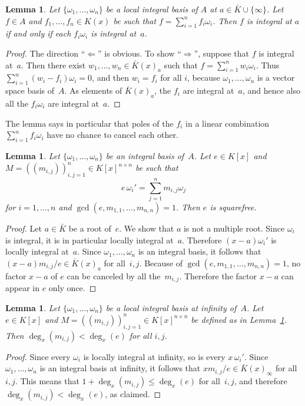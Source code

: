 \documentclass{sig-alternate}
\newtheorem{lemma}[theorem]{Lemma}
\begin{document}
\begin{lemma}\label{lemma:1}
  Let $\{\omega_1,\dots,\omega_n\}$ be a local integral basis of $A$ at $a\in\bar K\cup\{\infty\}$.
  Let $f\in A$ and $f_1,\dots,f_n\in K(x)$ be such that $f=\sum_{i=1}^nf_i\omega_i$.
  Then $f$ is integral at $a$ if and only if each $f_i\omega_i$ is integral at~$a$.
\end{lemma}
\begin{proof}
  The direction ``$\Leftarrow$'' is obvious. To show ``$\Rightarrow$'', suppose
  that $f$ is integral at~$a$. Then there exist $w_1,\dots,w_n\in\bar K(x)_a$ such that
  $f=\sum_{i=1}^nw_i\omega_i$. Thus $\sum_{i=1}^n(w_i-f_i)\omega_i=0$, and then
  $w_i=f_i$ for all $i$, because $\omega_1,\dots,\omega_n$ is a vector space basis of~$A$.
  As elements of $\bar K(x)_a$, the $f_i$ are integral at~$a$, and hence also all the $f_i\omega_i$
  are integral at~$a$.
\end{proof}

The lemma says in particular that poles of the $f_i$ in a linear combination
$\sum_{i=1}^n f_i\omega_i$ have no chance to cancel each other.

\begin{lemma}\label{lemma:e}
  Let $\{\omega_1,\dots,\omega_n\}$ be an integral basis of~$A$.
  Let $e\in K[x]$ and
  $M=((m_{i,j}))_{i,j=1}^n\in K[x]^{n\times n}$ be such that
  \[
    e\,\omega_i'=\sum_{j=1}^n m_{i,j}\omega_j
  \]
  for $i=1,\dots,n$ and $\gcd(e,m_{1,1},\dots,m_{n,n})=1$.
  Then $e$ is squarefree.
\end{lemma}
\begin{proof}
  Let $a\in\bar K$ be a root of~$e$. We show that $a$ is not a multiple root.
  Since $\omega_i$ is integral, it is in particular locally integral at~$a$.
  Therefore $(x-a)\omega_i'$ is locally integral at~$a$.
  Since $\omega_1,\dots,\omega_n$ is an integral basis, it follows that
  $(x-a)m_{i,j}/e\in\bar K(x)_a$ for all~$i,j$.
  Because of $\gcd(e,m_{1,1},\dots,m_{n,n})=1$, no factor $x-a$ of $e$
  can be canceled by all the~$m_{i,j}$.
  Therefore the factor $x-a$ can appear in $e$ only once.
\end{proof}

\begin{lemma} \label{lemma:degM}
  Let $\{\omega_1,\dots,\omega_n\}$ be a local integral basis at infinity of~$A$.
  Let $e\in K[x]$ and $M=((m_{i,j}))_{i,j=1}^n\in K[x]^{n\times n}$
  be defined as in Lemma~\ref{lemma:e}. Then $\deg_x(m_{i,j})<\deg_x(e)$ for all $i,j$.
\end{lemma}
\begin{proof}
  Since every $\omega_i$ is locally integral at infinity, so is every $x\,\omega_i'$.
  Since $\omega_1,\dots,\omega_n$ is an integral basis at infinity, it follows that
  $xm_{i,j}/e\in\bar K(x)_\infty$ for all~$i,j$. This means that $1+\deg_x(m_{i,j})\leq\deg_x(e)$
  for all~$i,j$, and therefore $\deg_x(m_{i,j})<\deg_x(e)$, as claimed.
\end{proof}
\end{document}
